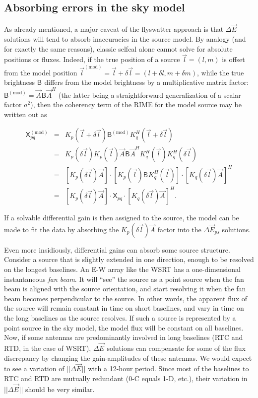 \documentclass[]{aa}
\newcommand{\herm}{H}
\newcommand{\jones}[2]{\vec {#1}_{#2}}
\newcommand{\jonesT}[2]{\vec {#1}^{\herm}_{#2}}
\newcommand{\coh}[2]{\mathsf{{#1}}_{{#2}}}
\begin{document}
\subsection{Absorbing errors in the sky model\label{sec:de-analysis-model}}

As already mentioned, a major caveat of the flyswatter approach is that $\Delta\jones{E}{}$ solutions will tend to absorb inaccuracies in the source model. By analogy (and for exactly the same reasons), classic selfcal 
alone cannot solve for absolute positions or fluxes. Indeed, if the true position of a source $\vec l = (l,m)$ is offset from the model position $\vec l^\mathrm{(mod)} = \vec l + \delta\vec l = (l+\delta l,m + \delta m)$, while the true brightness $\coh{B}{}$ differs from the model brightness by a multiplicative matrix factor: $\coh{B}{}^\mathrm{(mod)} = \jones{A}{} \coh{B}{} \jonesT{A}{}$ (the latter being a straightforward generalization of a scalar factor $a^2$), then the coherency term of the RIME for the model source may be written out as

\begin{eqnarray*}
\coh{X}{pq}^\mathrm{(mod)} & = & K_{p}(\vec l + \delta\vec l) \coh{B}{}^\mathrm{(mod)} K^\herm_{q}(\vec l + \delta\vec l) \\
 & = & K_{p}(\delta\vec l) K_{p}(\vec l) \jones{A}{}\coh{B}{}\jonesT{A}{} K^\herm_{q}(\vec l) K^\herm_{q}(\delta\vec l) \\
 & = & [ K_{p}(\delta\vec l)\jones{A}{}]\cdot[K_{p}(\vec l)\coh{B}{}K^\herm_{q}(\vec l)]\cdot[K_{q}(\delta \vec l)\jones{A}{}]^\herm \\
 & = & [K_{p}(\delta\vec l)\jones{A}{}] 
       \cdot \coh{X}{pq} \cdot 
       [K_{q}(\delta\vec l)\jones{A}{}]^\herm.
\end{eqnarray*}

If a solvable differential gain is then assigned to the source, the model can be made to fit the data by absorbing the $K_{p}(\delta\vec l)\jones{A}{}$ factor into the $\Delta\jones{E}{ps}$ solutions.

Even more insidiously, differential gains can absorb some source structure. Consider a source that is slightly extended in one direction, enough to be resolved on the longest baselines. An E-W array like the WSRT has a one-dimensional instantaneous {\em fan beam}. It will ``see'' the source as a point source when the fan beam is aligned with the source orientation, and start resolving it when the fan beam becomes perpendicular to the source. In other words, the apparent flux of the source will remain constant in time on short baselines, and vary in time on the long baselines as the source resolves. If such a source is represented by a point source in the sky model, the model flux will be constant on all baselines. Now, if some antennas are predominantly involved in long baselines (RTC and RTD, in the case of WSRT), $\Delta\jones{E}{}$ solutions can compensate for some of the flux discrepancy by changing the gain-amplitudes of these antennas. We would expect to see a variation of $||\Delta\jones{E}{}||$ with a 12-hour period. Since most of the baselines to RTC and RTD are mutually redundant (0-C equals 1-D, etc.), their variation in $||\Delta\jones{E}{}||$ should be very similar. 
\end{document}
